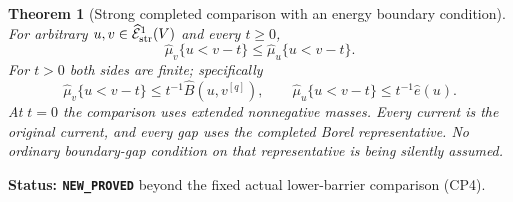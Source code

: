 \documentclass[11pt,a4paper]{article}
\numberwithin{equation}{section}
\newtheorem{theorem}{Theorem}[section]
\theoremstyle{definition}
\theoremstyle{remark}
\begin{document}
\begin{theorem}[Strong completed comparison with an energy boundary condition]
\label{thm:r11-strong-completed-comparison}
For arbitrary $u,v\in\widehat{\mathcal E}^1_{\rm str}(V)$ and
every $t\geq0$,
\[
          \boxed{\quad
          \widehat\mu_v\{u<v-t\}
                          \leq\widehat\mu_u\{u<v-t\}.
          \quad}
 \tag{CC5}
\]
For $t>0$ both sides are finite; specifically
\[
 \widehat\mu_v\{u<v-t\}
          \leq t^{-1}\widehat B(u,v^{[q]}),\qquad
 \widehat\mu_u\{u<v-t\}\leq t^{-1}\widehat e(u).
 \tag{CC6}
\]
At $t=0$ the comparison uses extended nonnegative masses.
Every current is the original current, and every gap uses
the completed Borel representative. No ordinary boundary-gap
condition on that representative is being silently assumed.
\end{theorem}

\noindent\textbf{Status: \texttt{NEW\_PROVED}} beyond the
fixed actual lower-barrier comparison (CP4).
\end{document}
